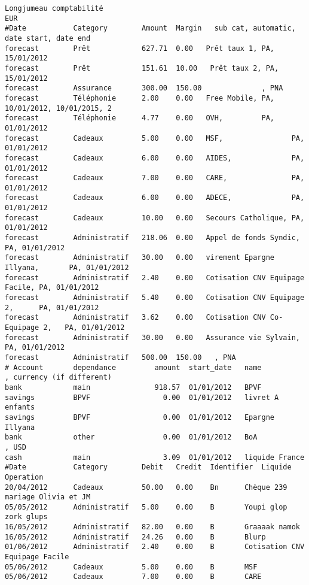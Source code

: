 \footnotesize
\begin{verbatim}
Longjumeau comptabilité
EUR
#Date           Category        Amount  Margin   sub cat, automatic, date start, date end
forecast        Prêt            627.71  0.00   Prêt taux 1, PA, 15/01/2012
forecast        Prêt            151.61  10.00   Prêt taux 2, PA, 15/01/2012
forecast        Assurance       300.00  150.00              , PNA
forecast        Téléphonie      2.00    0.00   Free Mobile, PA, 10/01/2012, 10/01/2015, 2
forecast        Téléphonie      4.77    0.00   OVH,         PA, 01/01/2012
forecast        Cadeaux         5.00    0.00   MSF,                PA, 01/01/2012
forecast        Cadeaux         6.00    0.00   AIDES,              PA, 01/01/2012
forecast        Cadeaux         7.00    0.00   CARE,               PA, 01/01/2012
forecast        Cadeaux         6.00    0.00   ADECE,              PA, 01/01/2012
forecast        Cadeaux         10.00   0.00   Secours Catholique, PA, 01/01/2012
forecast        Administratif   218.06  0.00   Appel de fonds Syndic,          PA, 01/01/2012
forecast        Administratif   30.00   0.00   virement Epargne Illyana,       PA, 01/01/2012
forecast        Administratif   2.40    0.00   Cotisation CNV Equipage Facile, PA, 01/01/2012
forecast        Administratif   5.40    0.00   Cotisation CNV Equipage 2,      PA, 01/01/2012
forecast        Administratif   3.62    0.00   Cotisation CNV Co-Equipage 2,   PA, 01/01/2012
forecast        Administratif   30.00   0.00   Assurance vie Sylvain,          PA, 01/01/2012
forecast        Administratif   500.00  150.00   , PNA
# Account       dependance         amount  start_date   name            , currency (if different)
bank            main               918.57  01/01/2012   BPVF
savings         BPVF                 0.00  01/01/2012   livret A enfants
savings         BPVF                 0.00  01/01/2012   Epargne Illyana
bank            other                0.00  01/01/2012   BoA             , USD
cash            main                 3.09  01/01/2012   liquide France
#Date           Category        Debit   Credit  Identifier  Liquide Operation
20/04/2012      Cadeaux         50.00   0.00    Bn      Chèque 239 mariage Olivia et JM
05/05/2012      Administratif   5.00    0.00    B       Youpi glop zork glups
16/05/2012      Administratif   82.00   0.00    B       Graaaak namok
16/05/2012      Administratif   24.26   0.00    B       Blurp
01/06/2012      Administratif   2.40    0.00    B       Cotisation CNV Equipage Facile
05/06/2012      Cadeaux         5.00    0.00    B       MSF
05/06/2012      Cadeaux         7.00    0.00    B       CARE

\end{verbatim}
